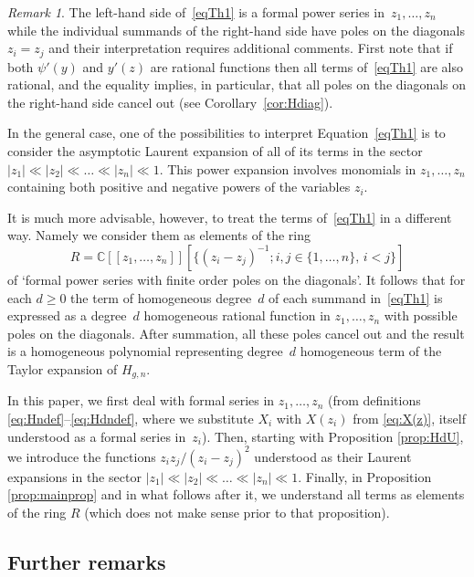 \documentclass[11pt]{article}
\newcommand{\Subsection}{\subsection}
\newcommand{\llbracket}{[\![}
\newcommand{\rrbracket}{]\!]}
\theoremstyle{plain}
\theoremstyle{definition}
\theoremstyle{remark}
\newtheorem{remark}[theorem]{Remark}
\begin{document}
\begin{remark}
The left-hand side of~\eqref{eqTh1} is a formal power series in~$z_1,\dots,z_n$ while the individual summands of the right-hand side have poles on the diagonals $z_i=z_j$ and their interpretation requires additional comments. First note that if both $\psi'(y)$ and $y'(z)$ are rational functions then all terms of~\eqref{eqTh1} are also rational, and the equality implies, in particular, that all poles on the diagonals on the right-hand side cancel out (see Corollary~\ref{cor:Hdiag}).

In the general case, one of the possibilities to interpret Equation~\eqref{eqTh1} is to consider the asymptotic Laurent expansion of all of its terms in the sector $|z_1|\ll |z_2|\ll\dots\ll |z_n|\ll 1$. This power expansion involves monomials in $z_1,\dots, z_n$ containing both positive and negative powers of the variables $z_i$.

It is much more advisable, however, to treat the terms of~\eqref{eqTh1} in a different way. Namely we consider them as elements of the ring
\[
R=\mathbb{C}\llbracket z_1,\dots,z_n\rrbracket [\{(z_i-z_j)^{-1}; i,j\in\{1,\ldots,n\},\,i<j\}]
\]
of `formal power series with finite order poles on the diagonals'. It follows that for each $d\ge0$ the term of homogeneous degree~$d$ of each summand in~\eqref{eqTh1} is expressed as a degree~$d$ homogeneous rational function in $z_1,\dots,z_n$ with possible poles on the diagonals. After summation, all these poles cancel out and the result is a homogeneous polynomial representing degree~$d$ homogeneous term of the Taylor expansion of $H_{g,n}$.

In this paper, we first deal with formal series in $z_1,\dots, z_n$ (from definitions \hbox{\eqref{eq:Hndef}--\eqref{eq:Hdndef}}, where we substitute $X_i$ with $X(z_i)$ from \eqref{eq:X(z)}, itself understood as a formal series in~$z_i$). Then, starting with Proposition \ref{prop:HdU}, we introduce the functions $z_iz_j/(z_i-z_j)^2$ understood as their Laurent expansions in the sector $|z_1|\ll |z_2|\ll\dots\ll |z_n|\ll 1$. Finally, in Proposition \ref{prop:mainprop} and in what follows after it, we understand all terms as elements of the ring $R$ (which does not make sense prior to that proposition).
\end{remark}

\Subsection{Further remarks}
\end{document}

